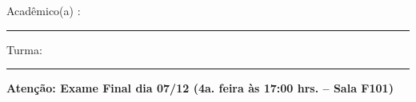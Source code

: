 \documentclass[a4paper,11pt]{article}
\begin{document}

\begin{large}
\begin{center}

\end{center}
\end{large} 

\vskip 0.2cm Acad\^emico(a) : \rule{10cm}{0.7pt} Turma:  \rule{1cm}{0.7pt}

{\bf Atenção: Exame Final dia 07/12 (4a. feira às 17:00 hrs. -- Sala F101)}
\end{document}
